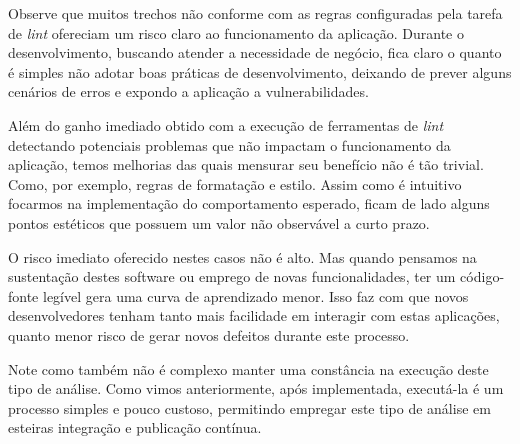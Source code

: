 Observe que muitos trechos não conforme com as regras configuradas pela tarefa de \textit{lint} ofereciam um risco claro ao funcionamento da aplicação. Durante o desenvolvimento, buscando atender a necessidade de negócio, fica claro o quanto é simples não adotar boas práticas de desenvolvimento, deixando de prever alguns cenários de erros e expondo a aplicação a vulnerabilidades.

Além do ganho imediado obtido com a execução de ferramentas de \textit{lint} detectando potenciais problemas que não impactam o funcionamento da aplicação, temos melhorias das quais mensurar seu benefício não é tão trivial. Como, por exemplo, regras de formatação e estilo. Assim como é intuitivo focarmos na implementação do comportamento esperado, ficam de lado alguns pontos estéticos que possuem um valor não observável a curto prazo. 

O risco imediato oferecido nestes casos não é alto. Mas quando pensamos na sustentação destes software ou emprego de novas funcionalidades, ter um código-fonte legível gera uma curva de aprendizado menor. Isso faz com que novos desenvolvedores tenham tanto mais facilidade em interagir com estas aplicações, quanto menor risco de gerar novos defeitos durante este processo.

Note como também não é complexo manter uma constância na execução deste tipo de análise. Como vimos anteriormente, após implementada, executá-la é um processo simples e pouco custoso, permitindo empregar este tipo de análise em esteiras integração e publicação contínua.
